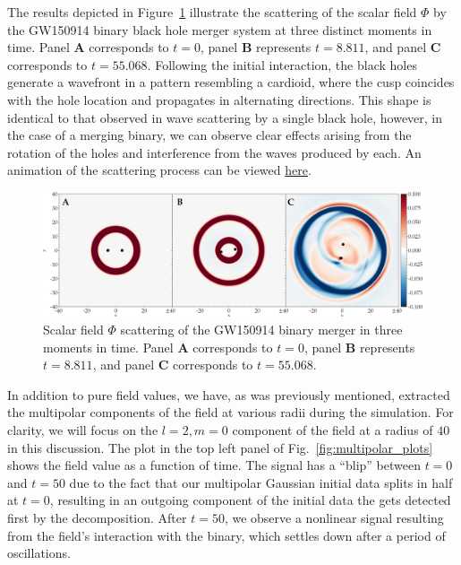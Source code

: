The results depicted in Figure~\ref{fig:wave_scattering_results} illustrate the scattering of the scalar field $\Phi$ by the GW150914 binary black hole merger system at three distinct moments in time. Panel \textbf{A} corresponds to $t = 0$, panel \textbf{B} represents $t = 8.811$, and panel \textbf{C} corresponds to $t = 55.068$. Following the initial interaction, the black holes generate a wavefront in a pattern resembling a cardioid, where the cusp coincides with the hole location and propagates in alternating directions. This shape is identical to that observed in wave scattering by a single black hole, however, in the case of a merging binary, we can observe clear effects arising from the rotation of the holes and interference from the waves produced by each. An animation of the scattering process can be viewed \href{https://github.com/lucass-carneiro/phd-thesis/tree/main/img/wave_scattering/scattering.gif}{here}.

\begin{figure}[h]
  \centering
  \includegraphics[width=\linewidth]{img/wave_scattering/scattering_frames}
  \caption{Scalar field $\Phi$ scattering of the GW150914 binary merger in three moments in time. Panel \textbf{A} corresponds to $t = 0$, panel \textbf{B} represents $t = 8.811$, and panel \textbf{C} corresponds to $t = 55.068$.}
  \label{fig:wave_scattering_results}
\end{figure}

In addition to pure field values, we have, as was previously mentioned, extracted the multipolar components of the field at various radii during the simulation. For clarity, we will focus on the $l=2,m=0$ component of the field at a radius of $40$ in this discussion. The plot in the top left panel of Fig.~\ref{fig:multipolar_plots} shows the field value as a function of time. The signal has a ``blip'' between $t=0$ and $t=50$ due to the fact that our multipolar Gaussian initial data splits in half at $t=0$, resulting in an outgoing component of the initial data the gets detected first by the decomposition. After $t=50$, we observe a nonlinear signal resulting from the field's interaction with the binary, which settles down after a period of oscillations.

